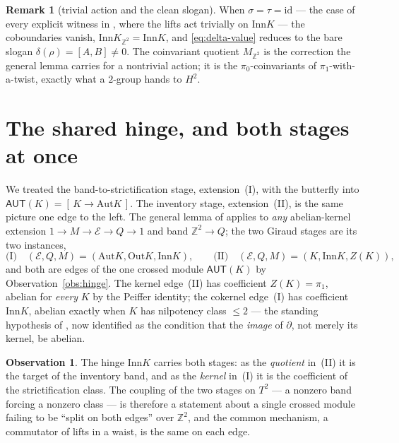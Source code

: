 \documentclass[11pt]{article}
\theoremstyle{definition}
\newtheorem{observation}[theorem]{Observation}
\newtheorem{remark}[theorem]{Remark}
\newcommand{\id}{\mathrm{id}}
\newcommand{\Z}{\mathbb{Z}}
\newcommand{\Aut}{\mathrm{Aut}}
\newcommand{\Inn}{\mathrm{Inn}}
\newcommand{\Out}{\mathrm{Out}}
\newcommand{\AUT}{\mathsf{AUT}}
\newcommand{\pizero}{\pi_0}
\newcommand{\pione}{\pi_1}
\begin{document}
\begin{remark}[trivial action and the clean slogan]\label{rem:trivial}
When $\sigma=\tau=\id$ --- the case of every explicit witness in \cite{capstone}, where the lifts
act trivially on $\Inn K$ --- the coboundaries vanish, $\Inn K_{\Z^2}=\Inn K$, and
\eqref{eq:delta-value} reduces to the bare slogan $\delta(\rho)=[A,B]\neq0$. The coinvariant
quotient $M_{\Z^2}$ is the correction the general lemma carries for a nontrivial action; it is the
$\pizero$-coinvariants of $\pione$-with-a-twist, exactly what a $2$-group hands to $H^2$.
\end{remark}

\section{The shared hinge, and both stages at once}\label{sec:hinge}

We treated the band-to-strictification stage, extension~(I), with the butterfly into
$\AUT(K)=[\,K\to\Aut K\,]$. The inventory stage, extension~(II), is the same picture one edge to the
left. The general lemma of \cite{capstone} applies to \emph{any} abelian-kernel extension
$1\to M\to \mathcal{E}\to Q\to1$ and band $\Z^2\to Q$; the two Giraud stages are its two instances,
\[
\text{(I)}\quad(\mathcal{E},Q,M)=(\Aut K,\Out K,\Inn K),\qquad
\text{(II)}\quad(\mathcal{E},Q,M)=(K,\Inn K,Z(K)),
\]
and both are edges of the one crossed module $\AUT(K)$ by Observation~\ref{obs:hinge}. The kernel
edge~(II) has coefficient $Z(K)=\pione$, abelian for \emph{every} $K$ by the Peiffer identity; the
cokernel edge~(I) has coefficient $\Inn K$, abelian exactly when $K$ has nilpotency class $\le2$
--- the standing hypothesis of \cite{capstone}, now identified as the condition that the
\emph{image} of $\partial$, not merely its kernel, be abelian.

\begin{observation}\label{obs:both-stages}
The hinge $\Inn K$ carries both stages: as the \emph{quotient} in~(II) it is the target of the
inventory band, and as the \emph{kernel} in~(I) it is the coefficient of the strictification class.
The coupling of the two stages on $T^2$ --- a nonzero band forcing a nonzero class --- is therefore
a statement about a single crossed module failing to be ``split on both edges'' over $\Z^2$, and
the common mechanism, a commutator of lifts in a waist, is the same on each edge.
\end{observation}
\end{document}

